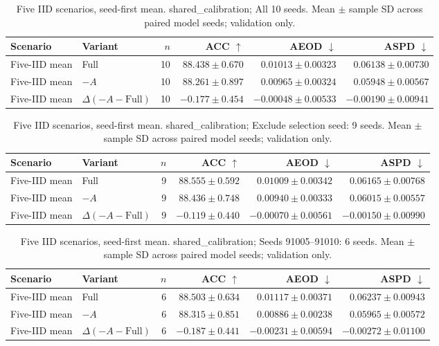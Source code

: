 \begin{table}[t]
\centering
\small
\caption{Five IID scenarios, seed-first mean. shared\_calibration; All 10 seeds. Mean $\pm$ sample SD across paired model seeds; validation only.}
\begin{tabular}{llrrrr}
\toprule
Scenario & Variant & $n$ & ACC $\uparrow$ & AEOD $\downarrow$ & ASPD $\downarrow$ \\
\midrule
Five-IID mean & Full & 10 & $88.438 \pm 0.670$ & $0.01013 \pm 0.00323$ & $0.06138 \pm 0.00730$ \\
Five-IID mean & $-A$ & 10 & $88.261 \pm 0.897$ & $0.00965 \pm 0.00324$ & $0.05948 \pm 0.00567$ \\
Five-IID mean & $\Delta(-A-\mathrm{Full})$ & 10 & $-0.177 \pm 0.454$ & $-0.00048 \pm 0.00533$ & $-0.00190 \pm 0.00941$ \\
\bottomrule
\end{tabular}
\end{table}

\begin{table}[t]
\centering
\small
\caption{Five IID scenarios, seed-first mean. shared\_calibration; Exclude selection seed: 9 seeds. Mean $\pm$ sample SD across paired model seeds; validation only.}
\begin{tabular}{llrrrr}
\toprule
Scenario & Variant & $n$ & ACC $\uparrow$ & AEOD $\downarrow$ & ASPD $\downarrow$ \\
\midrule
Five-IID mean & Full & 9 & $88.555 \pm 0.592$ & $0.01009 \pm 0.00342$ & $0.06165 \pm 0.00768$ \\
Five-IID mean & $-A$ & 9 & $88.436 \pm 0.748$ & $0.00940 \pm 0.00333$ & $0.06015 \pm 0.00557$ \\
Five-IID mean & $\Delta(-A-\mathrm{Full})$ & 9 & $-0.119 \pm 0.440$ & $-0.00070 \pm 0.00561$ & $-0.00150 \pm 0.00990$ \\
\bottomrule
\end{tabular}
\end{table}

\begin{table}[t]
\centering
\small
\caption{Five IID scenarios, seed-first mean. shared\_calibration; Seeds 91005–91010: 6 seeds. Mean $\pm$ sample SD across paired model seeds; validation only.}
\begin{tabular}{llrrrr}
\toprule
Scenario & Variant & $n$ & ACC $\uparrow$ & AEOD $\downarrow$ & ASPD $\downarrow$ \\
\midrule
Five-IID mean & Full & 6 & $88.503 \pm 0.634$ & $0.01117 \pm 0.00371$ & $0.06237 \pm 0.00943$ \\
Five-IID mean & $-A$ & 6 & $88.315 \pm 0.851$ & $0.00886 \pm 0.00238$ & $0.05965 \pm 0.00572$ \\
Five-IID mean & $\Delta(-A-\mathrm{Full})$ & 6 & $-0.187 \pm 0.441$ & $-0.00231 \pm 0.00594$ & $-0.00272 \pm 0.01100$ \\
\bottomrule
\end{tabular}
\end{table}
